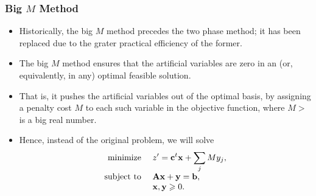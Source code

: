 \documentclass{beamer}
\theoremstyle{plain}
\let\ge\geqslant
\def\x{{\mathrm x}}
\def\y{{\mathrm y}}
\def\AA{{\bf \mathrm\bf A}}
\def\bb{{\bf \mathrm \bf b}}
\def\cc{{\bf \mathrm \bf c}}
\def\x{{\mathbf x}}
\def\y{{\mathbf y}}
\begin{document}
\begin{frame}\frametitle{Big $ M $ Method}
\justifying

\begin{itemize}
\justifying

\item Historically, the big $ M $ method precedes the two phase method; it has been replaced due to the grater practical efficiency of the former.

\item The big $ M $ method ensures that the artificial variables are zero in an (or, equivalently, in any) optimal feasible solution. 

\item That is, it pushes the artificial variables out of the optimal basis, by assigning a penalty cost $ M $ to each such variable in the objective function, where $ M > $ is a big real number.

\item Hence, instead of the original problem, we will solve
\begin{equation}
\label{eq18}
\begin{array}{rl}
\textrm{minimize } & \displaystyle z' = \cc^t\x + \sum_jMy_j, \\
\textrm{subject to } & \AA\x + \y = \bb,\\
& \x, \y \ge 0. \end{array}
\end{equation}

\end{itemize}

\end{frame}
\end{document}
